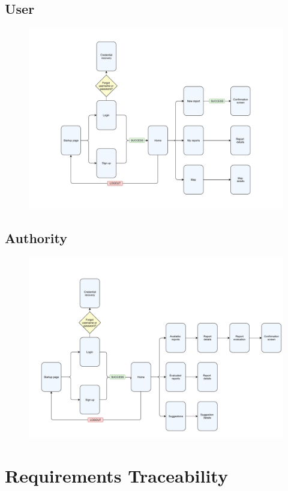 \documentclass[12pt,a4paper]{report}
\begin{document}
	\section{User}
		\begin{figure}[H]
				\includegraphics[scale = 0.6, center]{userux}
				\caption{}
		\end{figure}
	\section{Authority}		
		\begin{figure}[H]
				\includegraphics[scale = 0.65, center]{authorityux}
				\caption{}
		\end{figure}

	\chapter{Requirements Traceability}
\end{document}
